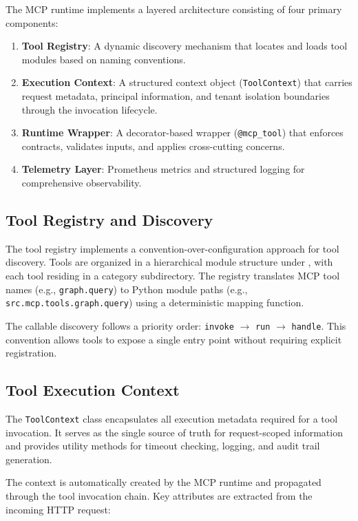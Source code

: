 \documentclass[a4paper,twoside]{sapthesis}
\begin{document}
The MCP runtime implements a layered architecture consisting of four primary components:

\begin{enumerate}
    \item \textbf{Tool Registry}: A dynamic discovery mechanism that locates and loads tool modules based on naming conventions.
    \item \textbf{Execution Context}: A structured context object (\texttt{ToolContext}) that carries request metadata, principal information, and tenant isolation boundaries through the invocation lifecycle.
    \item \textbf{Runtime Wrapper}: A decorator-based wrapper (\texttt{@mcp\_tool}) that enforces contracts, validates inputs, and applies cross-cutting concerns.
    \item \textbf{Telemetry Layer}: Prometheus metrics and structured logging for comprehensive observability.
\end{enumerate}

\subsection{Tool Registry and Discovery}
\label{subsec:tool-registry}

The tool registry implements a convention-over-configuration approach for tool discovery. Tools are organized in a hierarchical module structure under , with each tool residing in a category subdirectory. The registry translates MCP tool names (e.g., \texttt{graph.query}) to Python module paths (e.g., \texttt{src.mcp.tools.graph.query}) using a deterministic mapping function.

The callable discovery follows a priority order: \texttt{invoke} $\rightarrow$ \texttt{run} $\rightarrow$ \texttt{handle}. This convention allows tools to expose a single entry point without requiring explicit registration.

\subsection{Tool Execution Context}
\label{subsec:tool-context}

The \texttt{ToolContext} class encapsulates all execution metadata required for a tool invocation. It serves as the single source of truth for request-scoped information and provides utility methods for timeout checking, logging, and audit trail generation.

The context is automatically created by the MCP runtime and propagated through the tool invocation chain. Key attributes are extracted from the incoming HTTP request:
\end{document}
